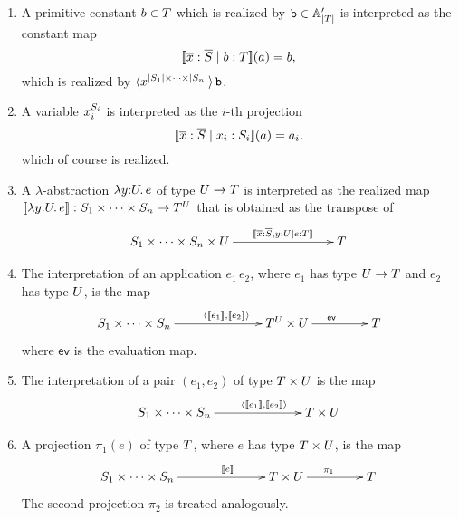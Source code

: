 \begin{enumerate}
\item A primitive constant $b \in T$ which is realized by $\mathtt{b}
  \in \mathbb{A}'_{|T|}$ is interpreted as the constant map
  \begin{equation*}
    [\![\overline{x} : \overline{S} \mid b : T]\!](a) = b,
  \end{equation*}
  which is realized by $\langle x^{|S_1| \times \cdots \times
      |S_n|} \rangle\, \mathtt{b}$.
\item A variable $x_i^{S_i}$ is interpreted as the $i$-th
  projection
  \begin{equation*}
    [\![\overline{x} : \overline{S} \mid x_i : S_i]\!](a) = a_i.
  \end{equation*}
  which of course is realized.
\item A $\lambda$-abstraction $\lambda y {:} U .\,e$ of type $U
  \to T$ is interpreted as the realized map
  $[\![\lambda y {:} U .\,e]\!] : S_1 \times \cdots \times
  S_n \to T^{U}$ that is obtained as the transpose
  of
  \begin{equation*}
    \xymatrix@+2em{
      **[l]{\asm{S}_1 \times \cdots \times \asm{S}_n \times \asm{U}}
      \ar[r]^{\sem{\overline{x}:\overline{\asm{S}}, y : \asm{U} \ctx e
        : \asm{T}}}
      &
      {\asm{T}}
    }
  \end{equation*}
\item The interpretation of an application $e_1\,e_2$, where $e_1$ has
  type $U \to T$ and $e_2$ has type $U$, is the map
  \begin{equation*}
    \xymatrix@+2em{
      **[l]{\asm{S}_1 \times \cdots \times \asm{S}_n}
      \ar[r]^{\pair{\sem{e_1}, \sem{e_2}}}
      &
      {\asm{T}^{\asm{U}} \times \asm{U}}
      \ar[r]^{\mathsf{ev}}
      &
      {\asm{T}}      
    }
  \end{equation*}
  where $\mathsf{ev}$ is the evaluation map.
\item The interpretation of a pair $(e_1, e_2)$ of type $T
  \times U$ is the map
  \begin{equation*}
    \xymatrix@+2em{
      **[l]{\asm{S}_1 \times \cdots \times \asm{S}_n}
      \ar[r]^{\pair{\sem{e_1}, \sem{e_2}}}
      &
      {\asm{T} \times \asm{U}}
    }
  \end{equation*}
\item A projection $\pi_1(e)$ of type $T$, where $e$ has type
  $T \times U$, is the map
  \begin{equation*}
    \xymatrix@+2em{
      **[l]{\asm{S}_1 \times \cdots \times \asm{S}_n}
      \ar[r]^{\sem{e}}
      &
      {\asm{T} \times \asm{U}}
      \ar[r]^{\pi_1}
      &
      {\asm{T}}
    }
  \end{equation*}
  The second projection $\pi_2$ is treated analogously.
\end{enumerate}
